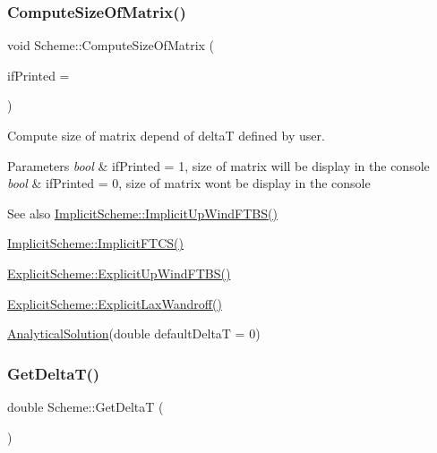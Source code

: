 \subsubsection{\texorpdfstring{Compute\+Size\+Of\+Matrix()}{ComputeSizeOfMatrix()}}
{\footnotesize\ttfamily void Scheme\+::\+Compute\+Size\+Of\+Matrix (\begin{DoxyParamCaption}\item[{bool}]{if\+Printed = {} }\end{DoxyParamCaption})\hspace{0.3cm}{\ttfamily [protected]}}

Compute size of matrix depend of deltaT defined by user. 
\begin{DoxyParams}{Parameters}
{\em bool} & if\+Printed = 1, size of matrix will be display in the console \\
\hline
{\em bool} & if\+Printed = 0, size of matrix won\textquotesingle{}t be display in the console \\
\hline
\end{DoxyParams}
\begin{DoxySeeAlso}{See also}
\mbox{\hyperlink{class_implicit_scheme_ab8311a005d69690622e0ddaa0dcff94d}{Implicit\+Scheme\+::\+Implicit\+Up\+Wind\+F\+T\+B\+S()}} 

\mbox{\hyperlink{class_implicit_scheme_afd2b8e73e914a04c326b8cba0d5810ce}{Implicit\+Scheme\+::\+Implicit\+F\+T\+C\+S()}} 

\mbox{\hyperlink{class_explicit_scheme_a52c0d19315a6014f43a9d007c70582d6}{Explicit\+Scheme\+::\+Explicit\+Up\+Wind\+F\+T\+B\+S()}} 

\mbox{\hyperlink{class_explicit_scheme_a2698e08e62763c56b972b478d665c34c}{Explicit\+Scheme\+::\+Explicit\+Lax\+Wandroff()}} 

\mbox{\hyperlink{class_scheme_a7d3e9f8133a955517471eb7a6fea355f}{Analytical\+Solution}}(double default\+DeltaT = 0) 
\end{DoxySeeAlso}
\mbox{\label{class_scheme_af05aa7671d5c080c0cca501cb6717cd0}} 
\subsubsection{\texorpdfstring{Get\+Delta\+T()}{GetDeltaT()}}
{\footnotesize\ttfamily double Scheme\+::\+Get\+DeltaT (\begin{DoxyParamCaption}{ }\end{DoxyParamCaption})}

